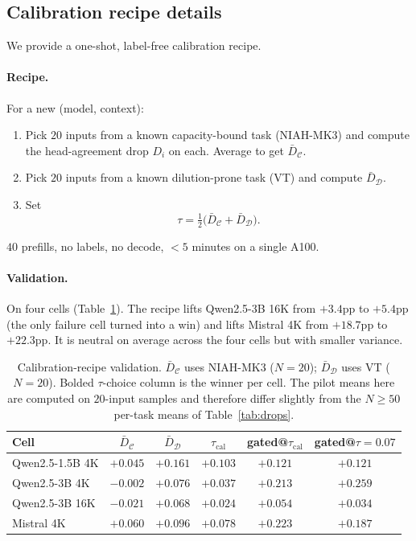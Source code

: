\documentclass{article}
\begin{document}
\subsection{Calibration recipe details}

We provide a one-shot, label-free calibration recipe.

\paragraph{Recipe.} For a new (model, context):
\begin{enumerate}
  \item Pick $20$ inputs from a known capacity-bound task (NIAH-MK3) and
  compute the head-agreement drop $D_i$ on each. Average to get
  $\bar D_{\mathcal C}$.
  \item Pick $20$ inputs from a known dilution-prone task (VT) and compute
  $\bar D_{\mathcal D}$.
  \item Set
  \begin{equation}
  \label{eq:tau}
  \tau = \tfrac{1}{2}\bigl(\bar D_{\mathcal C} + \bar D_{\mathcal D}\bigr).
  \end{equation}
\end{enumerate}
$40$ prefills, no labels, no decode, $<5$ minutes on a single A100.

\paragraph{Validation.} On four cells (Table~\ref{tab:recipe}). The recipe
lifts Qwen2.5-3B 16K from $+3.4$pp to $+5.4$pp (the only failure cell turned
into a win) and lifts Mistral 4K from $+18.7$pp to $+22.3$pp. It is
neutral on average across the four cells but with smaller variance.

\begin{table}[t]
\centering
\caption{Calibration-recipe validation. $\bar D_{\mathcal C}$ uses NIAH-MK3
($N = 20$); $\bar D_{\mathcal D}$ uses VT ($N = 20$).
Bolded $\tau$-choice column is the winner per cell. The pilot means here
are computed on $20$-input samples and therefore differ slightly from the
$N \ge 50$ per-task means of Table~\ref{tab:drops}.}
\label{tab:recipe}
\begin{tabular}{lccccc}
\toprule
Cell & $\bar D_{\mathcal C}$ & $\bar D_{\mathcal D}$ & $\tau_{\mathrm{cal}}$
& gated@$\tau_{\mathrm{cal}}$ & gated@$\tau\!=\!0.07$ \\
\midrule
Qwen2.5-1.5B 4K & $+0.045$ & $+0.161$ & $+0.103$ & $+0.121$ & $+0.121$ \\
Qwen2.5-3B 4K   & $-0.002$ & $+0.076$ & $+0.037$ & $+0.213$ & $\boldsymbol{+0.259}$ \\
Qwen2.5-3B 16K  & $-0.021$ & $+0.068$ & $+0.024$ & $\boldsymbol{+0.054}$ & $+0.034$ \\
Mistral 4K       & $+0.060$ & $+0.096$ & $+0.078$ & $\boldsymbol{+0.223}$ & $+0.187$ \\
\bottomrule
\end{tabular}
\end{table}
\end{document}
